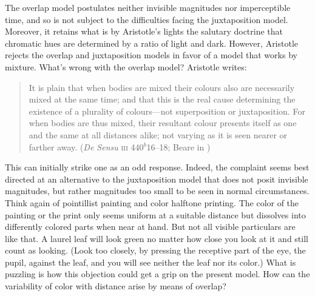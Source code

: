 The overlap model postulates neither invisible magnitudes nor imperceptible time, and so is not subject to the difficulties facing the juxtaposition model. Moreover, it retains what is by Aristotle's lights the salutary doctrine that chromatic hues are determined by a ratio of light and dark. However, Aristotle rejects the overlap and juxtaposition models in favor of a model that works by mixture. What's wrong with the overlap model? Aristotle writes:
\begin{quote}
	It is plain that when bodies are mixed their colours also are necessarily mixed at the same time; and that this is the real cause determining the existence of a plurality of colours—not superposition or juxtaposition. For when bodies are thus mixed, their resultant colour presents itself as one and the same at all distances alike; not varying as it is seen nearer or farther away. (\emph{De Sensu} \textsc{iii} 440\( ^{b} \)16--18; Beare in \citealt[10]{Barnes:1984uq})
\end{quote}
This can initially strike one as an odd response. Indeed, the complaint seems best directed at an alternative to the juxtaposition model that does not posit invisible magnitudes, but rather magnitudes too small to be seen in normal circumstances. Think again of pointillist painting and color halftone printing. The color of the painting or the print only seems uniform at a suitable distance but dissolves into differently colored parts when near at hand. But not all visible particulars are like that. A laurel leaf will look green no matter how close you look at it and still count as looking. (Look too closely, by pressing the receptive part of the eye, the pupil, against the leaf, and you will see neither the leaf nor its color.) What is puzzling is how this objection could get a grip on the present model. How can the variability of color with distance arise by means of overlap?

